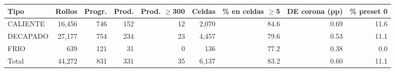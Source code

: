 \begin{tabular}{lrrrrrrrr}
\toprule
Tipo & Rollos & Progr. & Prod. & Prod. $\geq$300 & Celdas & \% en celdas $\geq$5 & DE corona (pp) & \% preset 0 \\
\midrule
CALIENTE & 16,456 & 746 & 152 & 12 & 2,070 & 84.6 & 0.69 & 11.6 \\
DECAPADO & 27,177 & 754 & 234 & 23 & 4,457 & 79.6 & 0.53 & 11.1 \\
FRIO & 639 & 121 & 31 & 0 & 136 & 77.2 & 0.38 & 0.0 \\
Total & 44,272 & 831 & 331 & 35 & 6,137 & 83.2 & 0.60 & 11.1 \\
\bottomrule
\end{tabular}
